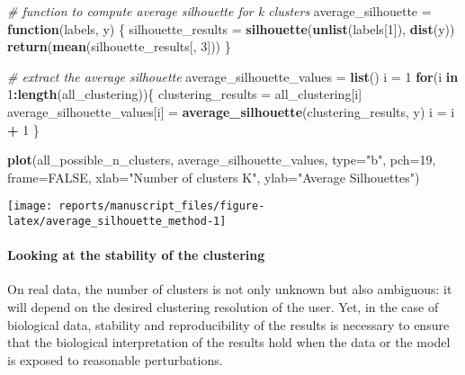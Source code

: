 \documentclass[9pt,a4paper,]{extarticle}
\newenvironment{Shaded}{\begin{snugshade}}{\end{snugshade}}
\newcommand{\CommentTok}[1]{\textcolor[rgb]{0.56,0.35,0.01}{\textit{#1}}}
\newcommand{\ControlFlowTok}[1]{\textcolor[rgb]{0.13,0.29,0.53}{\textbf{#1}}}
\newcommand{\DataTypeTok}[1]{\textcolor[rgb]{0.13,0.29,0.53}{#1}}
\newcommand{\DecValTok}[1]{\textcolor[rgb]{0.00,0.00,0.81}{#1}}
\newcommand{\KeywordTok}[1]{\textcolor[rgb]{0.13,0.29,0.53}{\textbf{#1}}}
\newcommand{\NormalTok}[1]{#1}
\newcommand{\OperatorTok}[1]{\textcolor[rgb]{0.81,0.36,0.00}{\textbf{#1}}}
\newcommand{\OtherTok}[1]{\textcolor[rgb]{0.56,0.35,0.01}{#1}}
\newcommand{\StringTok}[1]{\textcolor[rgb]{0.31,0.60,0.02}{#1}}
\begin{document}
\begin{Shaded}
\begin{Highlighting}[]
\CommentTok{# function to compute average silhouette for k clusters}
\NormalTok{average_silhouette =}\StringTok{ }\ControlFlowTok{function}\NormalTok{(labels, y) \{}
\NormalTok{    silhouette_results =}\StringTok{ }\KeywordTok{silhouette}\NormalTok{(}\KeywordTok{unlist}\NormalTok{(labels[}\DecValTok{1}\NormalTok{]), }\KeywordTok{dist}\NormalTok{(y))}
    \KeywordTok{return}\NormalTok{(}\KeywordTok{mean}\NormalTok{(silhouette_results[, }\DecValTok{3}\NormalTok{]))}
\NormalTok{\}}

\CommentTok{# extract the average silhouette}
\NormalTok{average_silhouette_values =}\StringTok{ }\KeywordTok{list}\NormalTok{()}
\NormalTok{i =}\StringTok{ }\DecValTok{1}
\ControlFlowTok{for}\NormalTok{(i }\ControlFlowTok{in} \DecValTok{1}\OperatorTok{:}\KeywordTok{length}\NormalTok{(all_clustering))\{}
\NormalTok{    clustering_results =}\StringTok{ }\NormalTok{all_clustering[i]}
\NormalTok{    average_silhouette_values[i] =}\StringTok{ }\KeywordTok{average_silhouette}\NormalTok{(clustering_results, y)}
\NormalTok{    i =}\StringTok{ }\NormalTok{i }\OperatorTok{+}\StringTok{ }\DecValTok{1}
\NormalTok{\}}

\KeywordTok{plot}\NormalTok{(all_possible_n_clusters, average_silhouette_values,}
     \DataTypeTok{type=}\StringTok{"b"}\NormalTok{, }\DataTypeTok{pch=}\DecValTok{19}\NormalTok{, }\DataTypeTok{frame=}\OtherTok{FALSE}\NormalTok{,}
     \DataTypeTok{xlab=}\StringTok{"Number of clusters K"}\NormalTok{,}
     \DataTypeTok{ylab=}\StringTok{"Average Silhouettes"}\NormalTok{)}
\end{Highlighting}
\end{Shaded}

\begin{center}\texttt{[image: reports/manuscript\_files/figure-latex/average\_silhouette\_method-1]} \end{center}

\hypertarget{looking-at-the-stability-of-the-clustering}{%
\paragraph{Looking at the stability of the clustering}\label{looking-at-the-stability-of-the-clustering}}

On real data, the number of clusters is not only unknown but also
ambiguous: it will depend on the desired clustering resolution of the user.
Yet, in the case of biological data, stability and reproducibility of the
results is necessary to ensure that the biological interpretation of the
results hold when the data or the model is exposed to reasonable
perturbations.
\end{document}
